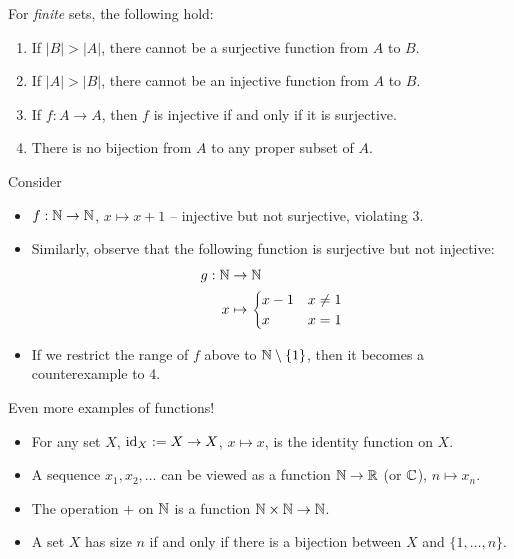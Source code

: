 \documentclass{../../template/note}
\begin{document}
    \begin{remark*}
        For \emph{finite} sets, the following hold:
        \begin{enumerate}[label=\protect\circled{\arabic*}]
            \item If \(|B| > |A|\), there cannot be a surjective function from \(A\) to \(B\).
            \item If \(|A| > |B|\), there cannot be an injective function from \(A\) to \(B\).
            \item If \(f: A \to A\), then \(f\) is injective if and only if it is surjective.
            \item There is no bijection from \(A\) to any proper subset of \(A\).
        \end{enumerate}
        Consider
        \begin{itemize}
            \item \(f: \mathbb N \to \mathbb N\), \(x \mapsto x+1\) -- injective but not surjective, violating 3.
            \item Similarly, observe that the following function is surjective but not injective:
            \begin{align*}
                g: \mathbb N &\to \mathbb N \\
                x &\mapsto \begin{cases}
                    x-1 & x \neq 1 \\
                    x & x = 1
                \end{cases}
            \end{align*}
            \item If we restrict the range of \(f\) above to \(\mathbb N \setminus \{1\}\), then it becomes a counterexample to 4.
        \end{itemize}
        
    \end{remark*}
    
    \begin{example}
        Even more examples of functions!
        \begin{itemize}
            \item For any set \(X\), \(\operatorname{id}_X := X \to X\), \(x \mapsto x\), is the identity function on \(X\).
            \item A sequence \(x_1, x_2, \dots\) can be viewed as a function \(\mathbb N \to \mathbb R\) (or \(\mathbb C\)), \(n \mapsto x_n\).
            \item The operation \(+\) on \(\mathbb N\) is a function \(\mathbb N \times \mathbb N \to \mathbb N\).
            \item A set \(X\) has size \(n\) if and only if there is a bijection between \(X\) and \(\{1, \dots, n\}\).
        \end{itemize}
        
        
    \end{example}
    
\end{document}

